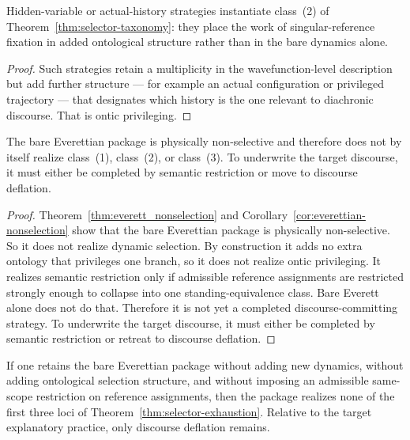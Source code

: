\begin{proposition}
\label{prop:hidden-ontic}
Hidden-variable or actual-history strategies instantiate class~(2) of
Theorem~\ref{thm:selector-taxonomy}: they place the work of singular-reference fixation in added
ontological structure rather than in the bare dynamics alone.
\end{proposition}

\begin{proof}
Such strategies retain a multiplicity in the wavefunction-level description but add further structure ---
for example an actual configuration or privileged trajectory --- that designates which history is the
one relevant to diachronic discourse. That is ontic privileging.
\end{proof}

\begin{proposition}
\label{prop:bare-everett-not-complete}
The bare Everettian package is physically non-selective and therefore does not by itself realize class~(1),
class~(2), or class~(3). To underwrite the target discourse, it must either be completed by semantic
restriction or move to discourse deflation.
\end{proposition}

\begin{proof}
Theorem~\ref{thm:everett_nonselection} and Corollary~\ref{cor:everettian-nonselection} show that the
bare Everettian package is physically non-selective. So it does not realize dynamic selection. By
construction it adds no extra ontology that privileges one branch, so it does not realize ontic
privileging. It realizes semantic restriction only if admissible reference assignments are restricted
strongly enough to collapse into one standing-equivalence class. Bare Everett alone does not do that.
Therefore it is not yet a completed discourse-committing strategy. To underwrite the target discourse,
it must either be completed by semantic restriction or retreat to discourse deflation.
\end{proof}

\begin{corollary}
\label{cor:bare-everett-exhaustion}
If one retains the bare Everettian package without adding new dynamics, without adding ontological
selection structure, and without imposing an admissible same-scope restriction on reference assignments,
then the package realizes none of the first three loci of Theorem~\ref{thm:selector-exhaustion}. Relative
to the target explanatory practice, only discourse deflation remains.
\end{corollary}


